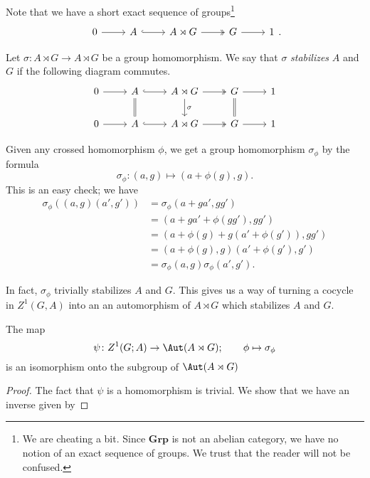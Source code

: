 \documentclass[main.tex]{subfiles}
\begin{document}
Note that we have a short exact sequence of groups\footnote{We are cheating a bit. Since $\mathbf{Grp}$ is not an abelian category, we have no notion of an exact sequence of groups. We trust that the reader will not be confused.}
\begin{equation*}
  \begin{tikzcd}
    0
    \arrow[r]
    & A
    \arrow[r, hook]
    & A \rtimes G
    \arrow[r, two heads]
    & G
    \arrow[r]
    & 1
  \end{tikzcd}.
\end{equation*}

Let $\sigma\colon A \rtimes G \to A \rtimes G$ be a group homomorphism. We say that $\sigma$ \emph{stabilizes} $A$ and $G$ if the following diagram commutes.
\begin{equation*}
  \begin{tikzcd}
    0
    \arrow[r]
    & A
    \arrow[r, hook]
    \arrow[d, equals]
    & A \rtimes G
    \arrow[r, two heads]
    \arrow[d, "\sigma"]
    & G
    \arrow[r]
    \arrow[d, equals]
    & 1
    \\
    0
    \arrow[r]
    & A
    \arrow[r, hook]
    & A \rtimes G
    \arrow[r, two heads]
    & G
    \arrow[r]
    & 1
  \end{tikzcd}
\end{equation*}

Given any crossed homomorphism $\phi$, we get a group homomorphism $\sigma_{\phi}$ by the formula
\begin{equation*}
  \sigma_{\phi}\colon (a, g) \mapsto (a + \phi(g), g).
\end{equation*}
This is an easy check; we have
\begin{align*}
  \sigma_{\phi}((a, g)(a', g')) &= \sigma_{\phi}(a + ga', gg') \\
  &= (a + ga' + \phi(gg'), gg') \\
  &= (a + \phi(g) + g(a' + \phi(g')), gg') \\
  &= (a + \phi(g), g)(a' + \phi(g'), g') \\
  &= \sigma_{\phi}(a, g)\sigma_{\phi}(a', g').
\end{align*}

In fact, $\sigma_{\phi}$ trivially stabilizes $A$ and $G$. This gives us a way of turning a cocycle in $Z^{1}(G, A)$ into an an automorphism of $A \rtimes G$ which stabilizes $A$ and $G$.

\begin{proposition}
  The map
  \begin{equation*}
    \psi\colon Z^{1}(G; A) \to \Aut(A \rtimes G);\qquad \phi \mapsto \sigma_{\phi}
  \end{equation*}
  is an isomorphism onto the subgroup of $\Aut(A \rtimes G)$
\end{proposition}
\begin{proof}
  The fact that $\psi$ is a homomorphism is trivial. We show that we have an inverse given by
\end{proof}
\end{document}
